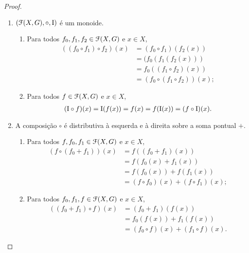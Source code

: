 \begin{proof}
\begin{enumerate}
	\item $(\mathcal{F}(X,G),\circ,\mathrm{I})$ é um monoide.
		\begin{enumerate}
		\item Para todos $f_0,f_1,f_2 \in \mathcal{F}(X,G)$ e $x \in X$,
			\begin{align*}
			((f_0 \circ f_1) \circ f_2)(x) &= (f_0 \circ f_1)(f_2(x)) \\
				&= (f_0(f_1(f_2(x))) \\
				&= f_0((f_1 \circ f_2)(x)) \\
				&= (f_0 \circ (f_1 \circ f_2))(x);
			\end{align*}
		\item Para todos $f \in \mathcal{F}(X,G)$ e $x \in X$,
			\begin{align*}
			(\mathrm{I} \circ f)(x) = \mathrm{I}(f(x)) = f(x) = f(\mathrm{I}(x)) = (f \circ \mathrm{I})(x).
			\end{align*}
		\end{enumerate}
	\item A composição $\circ$ é distributiva à esquerda e à direita sobre a soma pontual $+$.
		\begin{enumerate}
		\item Para todos $f,f_0,f_1 \in \mathcal{F}(X,G)$ e $x \in X$,
			\begin{align*}
			(f \circ (f_0+f_1))(x) &= f((f_0+f_1)(x)) \\
				&= f(f_0(x)+f_1(x)) \\
				&= f(f_0(x))+f(f_1(x)) \\
				&= (f \circ f_0)(x) + (f \circ f_1)(x);
			\end{align*}
		\item Para todos $f_0,f_1,f \in \mathcal{F}(X,G)$ e $x \in X$,
			\begin{align*}
			((f_0+f_1) \circ f)(x) &= (f_0+f_1)(f(x)) \\
				&= f_0(f(x)) + f_1(f(x)) \\
				&= (f_0 \circ f)(x) + (f_1 \circ f)(x).
			\end{align*}
		\end{enumerate}
	\end{enumerate}
\end{proof}

